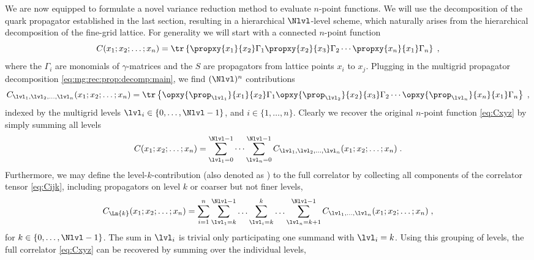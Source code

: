 We are now equipped to formulate a novel variance reduction method to evaluate $n$-point functions.
We will use the decomposition of the quark propagator established in the last section, resulting in a hierarchical $\Nlvl$-level scheme, which naturally arises from the hierarchical decomposition of the fine-grid lattice.
For generality we will start with a connected $n$-point function
\begin{equation} \label{eq:Cxyz}
C(x_1;x_2;\ldots;x_n) = \tr \left\{
\propxy{x_1}{x_2}
\Gamma_1
\propxy{x_2}{x_3}
\Gamma_2
\cdots
\propxy{x_n}{x_1}
\Gamma_n
\right\} \;,
\end{equation}
where the $\Gamma_i$ are monomials of $\gamma$-matrices and the $S$ are propagators from lattice points $x_i$ to $x_j$.
Plugging in the multigrid propagator decomposition \cref{eq:mg:rec:prop:decomp:main}, we find $(\Nlvl)^{n}$ contributions
\begin{equation} \label{eq:Cijk}
C_{\lvl_1, \lvl_2, \ldots, \lvl_n}(x_1;x_2;\ldots;x_n)
= \tr \left\{
\opxy{\prop_{\lvl_1}}{x_1}{x_2}
\Gamma_1
\opxy{\prop_{\lvl_2}}{x_2}{x_3}
\Gamma_2
\cdots
\opxy{\prop_{\lvl_n}}{x_n}{x_1}
\Gamma_n
\right\} \;,
\end{equation}
indexed by the multigrid levels $\lvl_i \in \{0, \ldots, \Nlvl-1\}$, and $i \in \{1, \ldots, n\}$.
Clearly we recover the original $n$-point function \cref{eq:Cxyz} by simply summing all levels
\begin{equation}
C(x_1;x_2;\ldots;x_n)
= \sum_{\lvl_1=0}^{\Nlvl-1} \cdots \sum_{\lvl_n=0}^{\Nlvl-1}
C_{\lvl_1, \lvl_2, \ldots, \lvl_n}(x_1;x_2;\ldots;x_n) \;.
\end{equation}
Furthermore, we may define the level-$k$-contribution (also denoted as ) to the full correlator by collecting all components of the correlator tensor \cref{eq:Cijk}, including propagators on level $k$ or coarser but not finer levels, \ie
\begin{align}
C_{\Ln{k}}(x_1;x_2;\ldots;x_n)
= \sum_{i=1}^{n}
  \sum_{\lvl_1=k}^{\Nlvl-1}
  \ldots
  \sum_{\lvl_i=k}^{k}
  \ldots
  \sum_{\lvl_n=k+1}^{\Nlvl-1}
  C_{\lvl_1, \ldots, \lvl_n}(x_1;x_2;\ldots;x_n) \;,
\end{align}
for $k \in \{0, \ldots, \Nlvl-1\}$.
The sum in $\lvl_i$ is trivial only participating one summand with $\lvl_i=k$.
Using this grouping of levels, the full correlator \cref{eq:Cxyz} can be recovered by summing over the individual levels,
